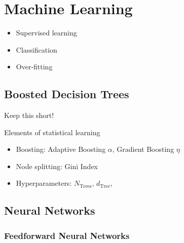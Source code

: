 \chapter{Machine Learning}
\label{sec:ml}

\begin{itemize}
\item Supervised learning
\item Classification
\item Over-fitting
\end{itemize}

\section{Boosted Decision Trees}
\label{sec:bdt}

Keep this short!

Elements of statistical learning \cite{esl}

\begin{itemize}
\item Boosting: Adaptive Boosting $\alpha$, Gradient Boosting $\eta$
\item Node splitting: Gini Index
\item Hyperparameters: $N_\mathrm{Trees}$, $d_\mathrm{Tree}$,
\end{itemize}

\section{Neural Networks}
\label{sec:nn}

\subsection{Feedforward Neural Networks}
\label{sec:nn_feedforward}

